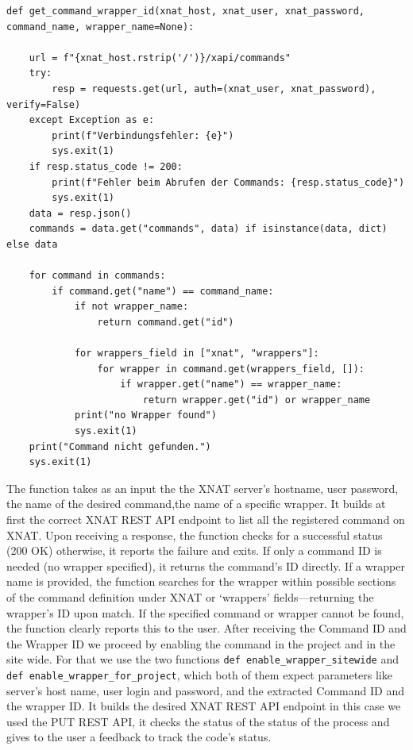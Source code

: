 \begin{lstlisting}
def get_command_wrapper_id(xnat_host, xnat_user, xnat_password, command_name, wrapper_name=None):
 
    url = f"{xnat_host.rstrip('/')}/xapi/commands"
    try:
        resp = requests.get(url, auth=(xnat_user, xnat_password), verify=False)
    except Exception as e:
        print(f"Verbindungsfehler: {e}")
        sys.exit(1)
    if resp.status_code != 200:
        print(f"Fehler beim Abrufen der Commands: {resp.status_code}")
        sys.exit(1)
    data = resp.json()
    commands = data.get("commands", data) if isinstance(data, dict) else data

    for command in commands:
        if command.get("name") == command_name:
            if not wrapper_name:
                return command.get("id")
            
            for wrappers_field in ["xnat", "wrappers"]:
                for wrapper in command.get(wrappers_field, []):
                    if wrapper.get("name") == wrapper_name:
                        return wrapper.get("id") or wrapper_name
            print("no Wrapper found")
            sys.exit(1)
    print("Command nicht gefunden.")
    sys.exit(1)
\end{lstlisting}
The function takes as an input the the XNAT server’s hostname, user password, the name of the desired command,the name of a specific wrapper. It builds at first the correct XNAT REST API endpoint to list all the registered command on XNAT.
Upon receiving a response, the function checks for a successful status (200 OK) otherwise, it reports the failure and exits. If only a command ID is needed (no wrapper specified), it returns the command’s ID directly. If a wrapper name is provided, the function searches for the wrapper within possible sections of the command definition under XNAT or ‘wrappers’ fields—returning the wrapper’s ID upon match. If the specified command or wrapper cannot be found, the function clearly reports this to the user.
After receiving the Command ID and the Wrapper ID we proceed by enabling the command in the project and in the site wide. For that we use the two functions \texttt{def enable\_wrapper\_sitewide} and \texttt{ def enable\_wrapper\_for\_project}, which both of them expect parameters like server’s host name, user login and  password, and the extracted Command ID and the wrapper ID. It builds the desired XNAT REST API endpoint in this case we used the PUT REST API, it checks the status of the status of the process and gives to the user a feedback to track the code's status.

